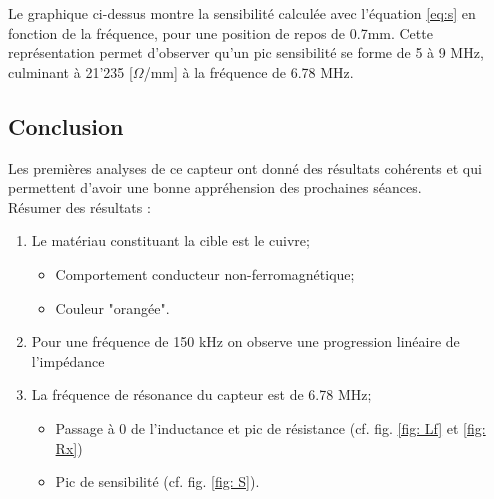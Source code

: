 
Le graphique ci-dessus montre la sensibilité calculée avec l'équation \ref{eq:s} en fonction
de la fréquence, pour une position de repos de 0.7mm. Cette représentation permet d'observer
qu'un pic sensibilité se forme de 5 à 9 MHz, culminant à 21'235 [$\Omega$/mm] à la fréquence 
de 6.78 MHz. 

 
\subsection{Conclusion}

Les premières analyses de ce capteur ont donné des résultats cohérents et qui permettent
d'avoir une bonne appréhension des prochaines séances.\\

Résumer des résultats :

\begin{enumerate}
    \item Le matériau constituant la cible est le cuivre;
    \begin{itemize}
        \item Comportement conducteur non-ferromagnétique;
        \item Couleur "orangée".
    \end{itemize}
    \item Pour une fréquence de 150 kHz on observe une progression linéaire de l'impédance 
    \item La fréquence de résonance du capteur est de 6.78 MHz;
    \begin{itemize}
        \item Passage à 0 de l'inductance et pic de résistance (cf. fig. \ref{fig: Lf} et \ref{fig: Rx})
        \item Pic de sensibilité (cf. fig. \ref{fig: S}). 
    \end{itemize}
\end{enumerate}

